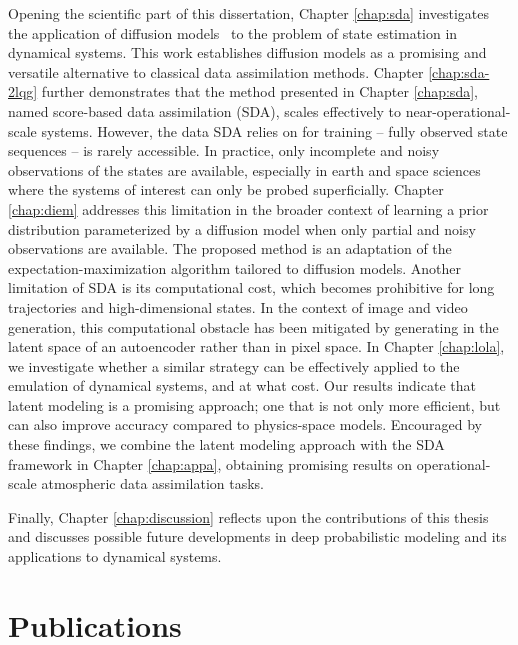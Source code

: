 Opening the scientific part of this dissertation, Chapter \ref{chap:sda} investigates the application of diffusion models~\cite{sohl-dickstein2015deep, ho2020denoising} to the problem of state estimation in dynamical systems. This work establishes diffusion models as a promising and versatile alternative to classical data assimilation \cite{ledimet1986variational, hamill2006ensemblebased, evensen2009data, carrassi2018data, ecmwf2020ifs} methods. Chapter \ref{chap:sda-2lqg} further demonstrates that the method presented in Chapter \ref{chap:sda}, named score-based data assimilation (SDA), scales effectively to near-operational-scale systems. However, the data SDA relies on for training -- fully observed state sequences -- is rarely accessible. In practice, only incomplete and noisy observations of the states are available, especially in earth and space sciences where the systems of interest can only be probed superficially. Chapter \ref{chap:diem} addresses this limitation in the broader context of learning a prior distribution parameterized by a diffusion model when only partial and noisy observations are available. The proposed method is an adaptation of the expectation-maximization \cite{hartley1958maximum, dempster1977maximum, wu1983convergence, mclachlan2007em, balakrishnan2017statistical} algorithm tailored to diffusion models. Another limitation of SDA is its computational cost, which becomes prohibitive for long trajectories and high-dimensional states. In the context of image and video generation, this computational obstacle has been mitigated by generating in the latent space of an autoencoder rather than in pixel space. In Chapter \ref{chap:lola}, we investigate whether a similar strategy can be effectively applied to the emulation of dynamical systems, and at what cost. Our results indicate that latent modeling is a promising approach; one that is not only more efficient, but can also improve accuracy compared to physics-space models. Encouraged by these findings, we combine the latent modeling approach with the SDA framework in Chapter \ref{chap:appa}, obtaining promising results on operational-scale atmospheric data assimilation tasks.

Finally, Chapter \ref{chap:discussion} reflects upon the contributions of this thesis and discusses possible future developments in deep probabilistic modeling and its applications to dynamical systems.

\section{Publications}


